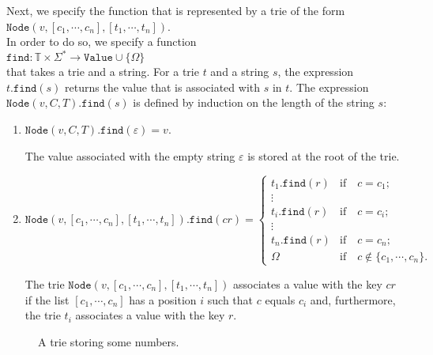 Next, we specify the function that is represented by a trie of the form 
\\[0.2cm]
\hspace*{1.3cm} 
$\texttt{Node}(v, [c_1, \cdots, c_n], [t_1, \cdots, t_n])$.
\\[0.2cm]
In order to do so, we specify a function
\\[0.2cm]
\hspace*{1.3cm} 
$\texttt{find}: \mathbb{T} \times \Sigma^* \rightarrow \texttt{Value} \cup \{ \Omega\}$
\\[0.2cm]
that takes a trie and a string.  For a trie $t$ and a string $s$, the expression $t.\texttt{find}(s)$ returns the
value that is associated with  $s$ in $t$.  The expression
$\texttt{Node}(v,C,T).\texttt{find}(s)$ is defined by induction on the length of the  string $s$:
\begin{enumerate}
\item $\texttt{Node}(v, C, T).\texttt{find}(\varepsilon) = v$.

      The value associated with the empty string $\varepsilon$ is stored at the root of the trie.
\item $\texttt{Node}(v, [c_1, \cdots, c_n], [t_1, \cdots, t_n]).\texttt{find}(cr) = 
        \left\{
        \begin{array}{ll}
        t_1.\texttt{find}(r) & \mbox{if} \quad c = c_1 \mbox{;} \\
        \vdots &                                     \\
        t_i.\texttt{find}(r) & \mbox{if} \quad c = c_i \mbox{;} \\
        \vdots &                                     \\
        t_n.\texttt{find}(r) & \mbox{if} \quad c = c_n \mbox{;} \\[0.2cm]
        \Omega               & \mbox{if} \quad c \notin \{c_1,\cdots,c_n\} \mbox{.}         
        \end{array}
       \right.$

      The trie $\texttt{Node}(v, [c_1, \cdots, c_n], [t_1, \cdots, t_n])$ associates a value with
      the key $cr$ if the list $[c_1, \cdots, c_n]$ has a position $i$ such that $c$ equals $c_i$
      and, furthermore, the trie  $t_i$ associates a value with the key  $r$.
\end{enumerate}

\begin{figure}[!ht]
  \centering
  \caption{A trie storing some numbers.}
  \label{fig:trie}
\end{figure}

